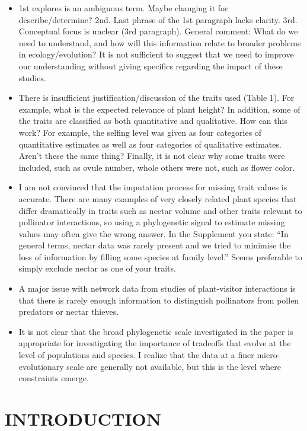 \documentclass[
  12pt,
  a4paper,
]{article}
\begin{document}
\begin{itemize}
\item
  1st explores is an ambiguous term. Maybe changing it for describe/determine? 2nd. Last phrase of the 1st paragraph lacks clarity. 3rd. Conceptual focus is unclear (3rd paragraph). General comment: What do we need to understand, and how will this information relate to broader problems in ecology/evolution? It is not sufficient to suggest that we need to improve our understanding without giving specifics regarding the impact of these studies.
\item
  There is insufficient justification/discussion of the traits used (Table 1). For example, what is the expected relevance of plant height? In addition, some of the traits are classified as both quantitative and qualitative. How can this work? For example, the selfing level was given as four categories of quantitative estimates as well as four categories of qualitative estimates. Aren't these the same thing? Finally, it is not clear why some traits were included, such as ovule number, whole others were not, such as flower color.
\item
  I am not convinced that the imputation process for missing trait values is accurate. There are many examples of very closely related plant species that differ dramatically in traits such as nectar volume and other traits relevant to pollinator interactions, so using a phylogenetic signal to estimate missing values may often give the wrong answer. In the Supplement you state: ``In general terms, nectar data was rarely present and we tried to minimise the loss of information by filling some species at family level.'' Seems preferable to simply exclude nectar as one of your traits.
\item
  A major issue with network data from studies of plant-visitor interactions is that there is rarely enough information to distinguish pollinators from pollen predators or nectar thieves.
\item
  It is not clear that the broad phylogenetic scale investigated in the paper is appropriate for investigating the importance of tradeoffs that evolve at the level of populations and species. I realize that the data at a finer micro-evolutionary scale are generally not available, but this is the level where constraints emerge.
\end{itemize}

\hypertarget{introduction}{%
\section{INTRODUCTION}\label{introduction}}
\end{document}

